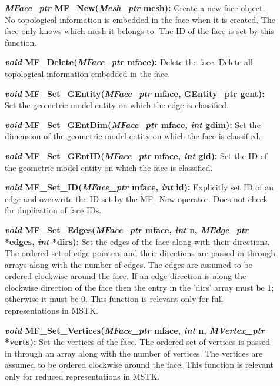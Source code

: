 \documentclass[12pt]{article}
\begin{document}
\begin{description}
\item[]\textbf{\textit{MFace\_ptr} MF\_New(\textit{Mesh\_ptr} mesh):} Create
a new face object. No topological information is embedded in the face
when it is created. The face only knows which mesh it belongs
to. The ID of the face is set by this function.

\item[]\textbf{\textit{void} MF\_Delete(\textit{MFace\_ptr} mface):} Delete
the face. Delete all topological information embedded in the face.

\item[]\textbf{\textit{void} MF\_Set\_GEntity(\textit{MFace\_ptr} mface, GEntity\_ptr gent):} Set the geometric model entity on which the edge is classified.

\item[]\textbf{\textit{void} MF\_Set\_GEntDim(\textit{MFace\_ptr} mface,
\textit{int} gdim):} Set the dimension of the geometric model entity on
which the face is classified.

\item[]\textbf{\textit{void} MF\_Set\_GEntID(\textit{MFace\_ptr} mface,
\textit{int} gid):} Set the ID of the geometric model entity on which
the face is classified.

\item[]\textbf{\textit{void} MF\_Set\_ID(\textit{MFace\_ptr} mface,
\textit{int} id):} Explicitly set ID of an edge and overwrite the ID
set by the MF\_New operator. Does not check for duplication of face
IDs.

\item[]\textbf{\textit{void} MF\_Set\_Edges(\textit{MFace\_ptr} mface,
\textit{int} n, \textit{MEdge\_ptr} *edges, \textit{int} *dirs):} Set
the edges of the face along with their directions. The ordered set of
edge pointers and their directions are passed in through arrays along
with the number of edges. The edges are assumed to be ordered
clockwise around the face. If an edge direction is along the clockwise
direction of the face then the entry in the 'dirs' array must be 1;
otherwise it must be 0. This function is relevant only for full
representations in MSTK.

\item[]\textbf{\textit{void} MF\_Set\_Vertices(\textit{MFace\_ptr} mface,
\textit{int} n, \textit{MVertex\_ptr} *verts):} Set the vertices of the
face. The ordered set of vertices is passed in through an array along
with the number of vertices. The vertices are assumed to be ordered
clockwise around the face. This function is relevant only for reduced
representations in MSTK.



\end{description}
\end{document}

